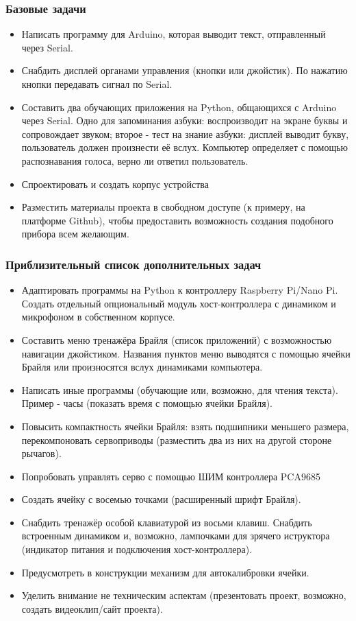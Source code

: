 \documentclass[a4paper,12pt]{article} %
\begin{document}
\subsubsection{Базовые задачи}
\begin{itemize}
\item{}Написать программу для Arduino, которая выводит текст, отправленный через Serial.
\item{}Снабдить дисплей органами управления (кнопки или джойстик). По нажатию кнопки передавать сигнал по Serial.
\item{}Составить два обучающих приложения на Python, общающихся с Arduino через Serial. Одно для запоминания азбуки: воспроизводит на экране буквы и сопровождает звуком; второе - тест на знание азбуки: дисплей выводит букву, пользователь должен произнести её вслух. Компьютер определяет с помощью распознавания голоса, верно ли ответил пользователь.
\item{}Спроектировать и создать корпус устройства
\item{}Разместить материалы проекта в свободном доступе (к примеру, на платформе Github), чтобы предоставить возможность создания подобного прибора всем желающим.
\end{itemize}
\subsubsection{Приблизительный список дополнительных задач}
\begin{itemize}
\item{}Адаптировать программы на Python к контроллеру Raspberry Pi/Nano Pi. Создать отдельный опциональный модуль хост-контроллера с динамиком и микрофоном в собственном корпусе.
\item{}Составить меню тренажёра Брайля (список приложений) с возможностью навигации джойстиком. Названия пунктов меню выводятся с помощью ячейки Брайля или произносятся вслух динамиками компьютера.
\item{}Написать иные программы (обучающие или, возможно, для чтения текста). Пример - часы (показать время с помощью ячейки Брайля).
\item{}Повысить компактность ячейки Брайля: взять подшипники меньшего размера, перекомпоновать сервоприводы (разместить два из них на другой стороне рычагов).
\item{}Попробовать управлять серво с помощью ШИМ контроллера PCA9685
\item{}Создать ячейку с восемью точками (расширенный шрифт Брайля).
\item{}Снабдить тренажёр особой клавиатурой из восьми клавиш. Снабдить встроенным динамиком и, возможно, лампочками для зрячего иструктора (индикатор питания и подключения хост-контроллера).
\item{}Предусмотреть в конструкции механизм для автокалибровки ячейки.
\item{}Уделить внимание не техническим аспектам (презентовать проект, возможно, создать видеоклип/сайт проекта).
\end{itemize}
\end{document}
